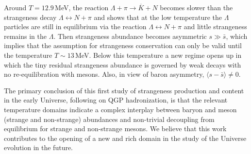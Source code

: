 Around $T=12.9$\,MeV, the reaction $\Lambda+\pi\rightarrow\overline{K}+N$ becomes slower than the strangeness decay $\Lambda\leftrightarrow N+\pi$ and shows that at the low temperature the $\Lambda$ particles are still in equilibrium via the reaction $\Lambda\leftrightarrow N+\pi$ and little strangeness remains in the $\Lambda$. Then strangeness abundance becomes asymmetric $s\gg \bar{s}$, which implies that the assumption for strangeness conservation can only be valid until the temperature $T\sim13$\,MeV. Below this temperature a new regime opens up in which the tiny residual strangeness abundance is governed by weak decays with no re-equilibration with mesons. Also, in view of baron asymmetry, $\langle s-\bar s\rangle \ne 0$.

The primary conclusion of this first study of strangeness production and content in the early Universe, following on QGP hadronization, is that the relevant temperature domains indicate a complex interplay between baryon and meson (strange and non-strange) abundances and non-trivial decoupling from equilibrium for strange and non-strange mesons. We believe that this work contributes to the opening of a new and rich domain in the study of the Universe evolution in the future. 




